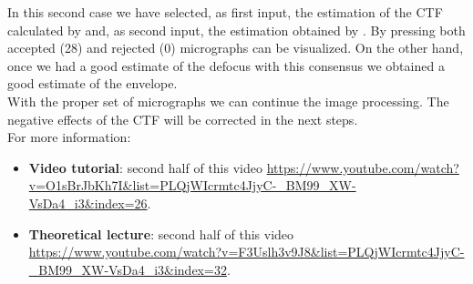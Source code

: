  In this second case we have selected, as first input, the estimation of the CTF calculated by  and, as second input, the estimation obtained by . By pressing  both accepted (28) and rejected (0) micrographs can be visualized. On the other hand, once we had a good estimate of the defocus with this consensus we obtained a good estimate of the envelope.\\ 

With the proper set of micrographs we can continue the image processing. The negative effects of the CTF will be corrected in the next steps.\\

For more information: 
\begin{itemize}
   \item \textbf{Video tutorial}: second half of this video \url{https://www.youtube.com/watch?v=O1sBrJbKh7I&list=PLQjWIcrmtc4JjyC-_BM99_XW-VsDa4_i3&index=26}.
   \item \textbf{Theoretical lecture}: second half of this video \url{https://www.youtube.com/watch?v=F3Uslh3v9J8&list=PLQjWIcrmtc4JjyC-_BM99_XW-VsDa4_i3&index=32}.
  \end{itemize}

